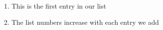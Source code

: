 \documentclass{article}
\begin{document}
    \begin{enumerate}
        \item This is the first entry in our list
        \item The list numbers increase with each entry we add
    \end{enumerate}   
\end{document}

